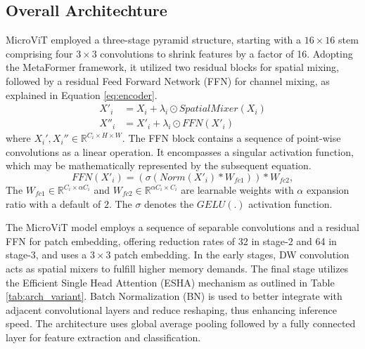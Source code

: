 \subsection{Overall Architechture}
MicroViT employed a three-stage pyramid structure, starting with a $16\times 16$ stem comprising four $3\times3$ convolutions to shrink features by a factor of 16. Adopting the MetaFormer \cite{yu2022metaformer} framework, it utilized two residual blocks for spatial mixing, followed by a residual Feed Forward Network (FFN) for channel mixing, as explained in Equation \ref{eq:encoder}.
\begin{align}
    X'_i &= X_i+\lambda_i \odot SpatialMixer(X_i)\\
    X''_i &= X'_i+\lambda_i \odot FFN(X'_i)
    \label{eq:encoder}
\end{align} 
where $X_i', X_i'' \in \mathbb{R}^{C_i \times H\times W } $. The FFN block contains a sequence of point-wise convolutions as a linear operation. It encompasses a singular activation function, which may be mathematically represented by the subsequent equation.
\begin{equation}
    FFN(X'_i)=(\sigma(Norm(X'_i)*W_{fc1}))*W_{fc2},
\end{equation}
 The $W_{fc1} \in \mathbb{R}^{C_i\times \alpha C_i}$ and $W_{fc2} \in \mathbb{R}^{\alpha C_i\times C_i}$ are learnable weights with $\alpha$ expansion ratio with a default of 2. The $\sigma$ denotes the $GELU(.)$ activation function.

The MicroViT model employs a sequence of separable convolutions and a residual FFN for patch embedding, offering reduction rates of 32 in stage-2 and 64 in stage-3, and uses a $3 \times 3$ patch embedding. In the early stages, DW convolution acts as spatial mixers to fulfill higher memory demands. The final stage utilizes the Efficient Single Head Attention (ESHA) mechanism as outlined in Table \ref{tab:arch_variant}. Batch Normalization (BN) is used to better integrate with adjacent convolutional layers and reduce reshaping, thus enhancing inference speed. The architecture uses global average pooling followed by a fully connected layer for feature extraction and classification.


